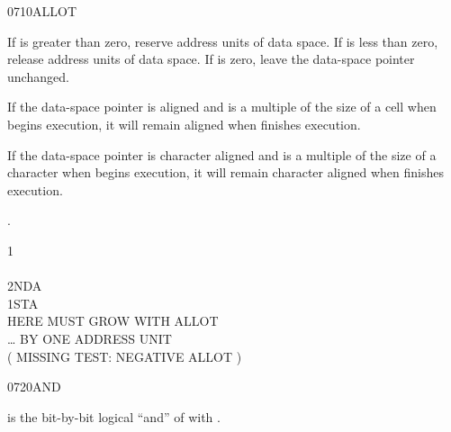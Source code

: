 \vspace*{-1ex}
\begin{worddef}{0710}{ALLOT}
\item {}

	If  is greater than zero, reserve  address units
	of data space. If  is less than zero, release 
	address units of data space. If  is zero, leave the
	data-space pointer unchanged.

	If the data-space pointer is aligned and  is a multiple
	of the size of a cell when  begins execution, it will
	remain aligned when  finishes execution.

	If the data-space pointer is character aligned and  is a
	multiple of the size of a character when  begins
	execution, it will remain character aligned when 
	finishes execution.

\see {}.

	\begin{testing} %
		\ttfamily
		 1  \\
		 \\
		 2NDA \\
		 1STA \\
		 \tab {} HERE MUST GROW WITH ALLOT \\
		 \tab {} {\ldots} BY ONE ADDRESS UNIT \\
		( MISSING TEST: NEGATIVE ALLOT )
	\end{testing}
\end{worddef}

\vspace*{-1ex}
\begin{worddef}{0720}{AND}
\item {}

	 is the bit-by-bit logical ``and'' of 
	with .

	\begin{testing} %
		 \\
		 \\
		 \\

		 \\

		 \\
		 \\
		 \\
	\end{testing}
\end{worddef}

